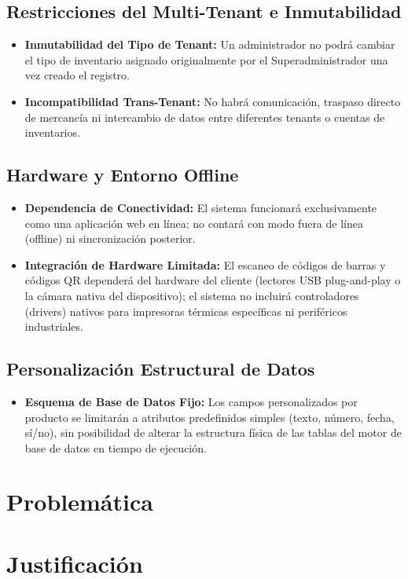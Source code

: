 \subsection{Restricciones del Multi-Tenant e Inmutabilidad}

\begin{itemize}
    \item \textbf{Inmutabilidad del Tipo de Tenant:} Un administrador no podrá cambiar el tipo de inventario asignado originalmente por el Superadministrador una vez creado el registro.

    \item \textbf{Incompatibilidad Trans-Tenant:} No habrá comunicación, traspaso directo de mercancía ni intercambio de datos entre diferentes tenants o cuentas de inventarios.
\end{itemize}

\subsection{Hardware y Entorno Offline}

\begin{itemize}
    \item \textbf{Dependencia de Conectividad:} El sistema funcionará exclusivamente como una aplicación web en línea; no contará con modo fuera de línea (offline) ni sincronización posterior.

    \item \textbf{Integración de Hardware Limitada:} El escaneo de códigos de barras y códigos QR dependerá del hardware del cliente (lectores USB plug-and-play o la cámara nativa del dispositivo); el sistema no incluirá controladores (drivers) nativos para impresoras térmicas específicas ni periféricos industriales.
\end{itemize}

\subsection{Personalización Estructural de Datos}

\begin{itemize}
    \item \textbf{Esquema de Base de Datos Fijo:} Los campos personalizados por producto se limitarán a atributos predefinidos simples (texto, número, fecha, sí/no), sin posibilidad de alterar la estructura física de las tablas del motor de base de datos en tiempo de ejecución.
\end{itemize}

\section{Problemática}


\section{Justificación}

